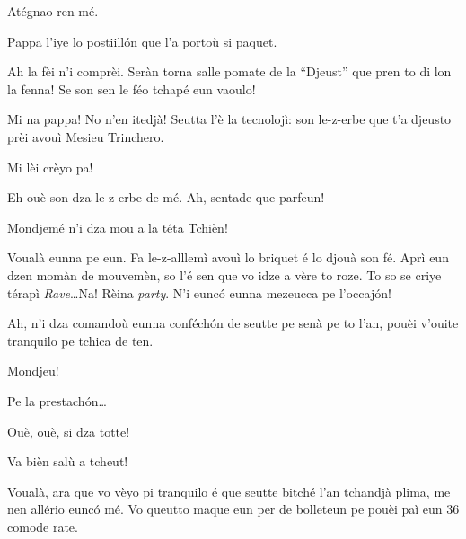 \begin{drama}
\Cienspeaks Atégnao ren mé.


\Simonspeaks Pappa l’iye lo postiill\'on que l’a portoù si paquet.

\Cienspeaks Ah la fèi n'i comprèi. Seràn torna salle pomate de la ``Djeust'' que pren to di lon la fenna! Se son sen le féo tchapé eun vaoulo!

\Simonspeaks Mi na pappa! No n'en itedjà! Seutta l'è la tecnolojì: son le-z-erbe que t’a djeusto prèi avouì Mesieu Trinchero.

\Cienspeaks Mi lèi crèyo pa!


\Trincherospeaks Eh ouè son dza le-z-erbe de mé. Ah, sentade que parfeun!


\Mariettospeaks Mondjemé n’i dza mou a la téta Tchièn!


\Trincherospeaks Voualà eunna pe eun. Fa le-z-alllemì avouì lo briquet é lo djouà son fé. Aprì eun dzen momàn de mouvemèn, so l’é sen que vo idze a vère to roze. To so se criye térapì \textit{Rave}\ldots Na! Rèina \textit{party}. N’i eunc\'o eunna mezeucca pe l’occaj\'on!




\Trincherospeaks Ah, n’i dza comandoù eunna conféch\'on de seutte pe senà pe to l’an, pouèi v'ouite tranquilo pe tchica de ten. 

\Cienspeaks Mondjeu!

\Trincherospeaks Pe la prestach\'on\ldots

\Cienspeaks Ouè, ouè, si dza totte!

\Trincherospeaks Va bièn salù a tcheut!


\Chefspeaks Voualà, ara que vo vèyo pi tranquilo é  que seutte bitché l’an tchandjà plima, me nen allério eunc\'o mé. Vo queutto maque eun per de  bolleteun pe pouèi paì eun 36 comode rate.


\end{drama}
